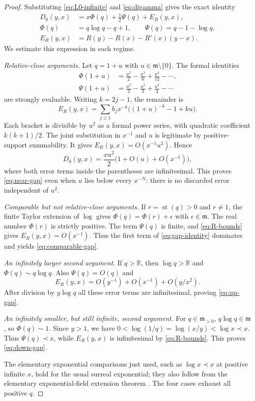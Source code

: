 \documentclass[11pt,letterpaper]{article}
\numberwithin{equation}{section}
\theoremstyle{plain}
\theoremstyle{definition}
\theoremstyle{remark}
\newcommand{\R}{\mathbb R}
\newcommand{\mi}{\mathfrak m}
\newcommand{\st}{\operatorname{st}}
\begin{document}
\begin{proof}
Substituting \eqref{eq:L0-infinite} and \eqref{eq:digamma} gives the exact
identity
\begin{align}
 D_0(y,x)
 &=x\Phi(q)+\frac12\Psi(q)+E_R(y,x),\label{eq:gap-identity}\\
 \Phi(q)&=q\log q-q+1,\qquad
 \Psi(q)=q-1-\log q,\label{eq:kernels}\\
 E_R(y,x)&=R(y)-R(x)-R'(x)(y-x).
\end{align}
We estimate this expression in each regime.

\emph{Relative-close arguments.}
Let $q=1+u$ with $u\in\mi\setminus\{0\}$. The formal identities
\begin{align}
 \Phi(1+u)&=\frac{u^2}{2}-\frac{u^3}{6}+\frac{u^4}{12}-\cdots,
 \label{eq:phi-series}\\
 \Psi(1+u)&=\frac{u^2}{2}-\frac{u^3}{3}+\frac{u^4}{4}-\cdots
\end{align}
are strongly evaluable. Writing $k=2j-1$, the remainder is
\begin{equation}\label{eq:R-gap-series}
 E_R(y,x)=\sum_{j\ge1}b_jx^{-k}
 \bigl((1+u)^{-k}-1+ku\bigr).
\end{equation}
Each bracket is divisible by $u^2$ as a formal power series, with quadratic
coefficient $k(k+1)/2$. The joint substitution in $x^{-1}$ and $u$ is
legitimate by positive-support summability. It gives
$E_R(y,x)=O(x^{-1}u^2)$. Hence
\[
 D_0(y,x)=\frac{xu^2}{2}\bigl(1+O(u)+O(x^{-1})\bigr),
\]
where both error terms inside the parentheses are infinitesimal.
This proves \eqref{eq:near-gap} even when $u$ lies below every
$x^{-N}$: there is no discarded error independent of $u^2$.

\emph{Comparable but not relative-close arguments.}
If $r=\st(q)>0$ and $r\ne1$, the finite Taylor extension of $\log$
gives $\Phi(q)=\Phi(r)+\epsilon$ with $\epsilon\in\mi$.
The real number $\Phi(r)$ is strictly positive. The term $\Psi(q)$ is
finite, and \eqref{eq:R-bounds} gives $E_R(y,x)=O(x^{-1})$.
Thus the first term of \eqref{eq:gap-identity} dominates and yields
\eqref{eq:comparable-gap}.

\emph{An infinitely larger second argument.}
If $q>\R$, then $\log q>\R$ and
$\Phi(q)\sim q\log q$. Also $\Psi(q)=O(q)$ and
\[
 E_R(y,x)=O(y^{-1})+O(x^{-1})+O(y/x^2).
\]
After division by $y\log q$ all these error terms are infinitesimal,
proving \eqref{eq:up-gap}.

\emph{An infinitely smaller, but still infinite, second argument.}
For $q\in\mi_{>0}$, $q\log q\in\mi$, so $\Phi(q)\sim1$.
Since $y>1$, we have
$0<\log(1/q)=\log(x/y)<\log x\prec x$.
Thus $\Psi(q)\prec x$, while $E_R(y,x)$ is infinitesimal by
\eqref{eq:R-bounds}. This proves \eqref{eq:down-gap}.

The elementary exponential comparisons just used, such as
$\log x\prec x$ at positive infinite $x$, hold for the usual surreal
exponential; they also follow from the elementary exponential-field
extension theorem \cite{vdDE}. The four cases exhaust all positive $q$.
\end{proof}
\end{document}
